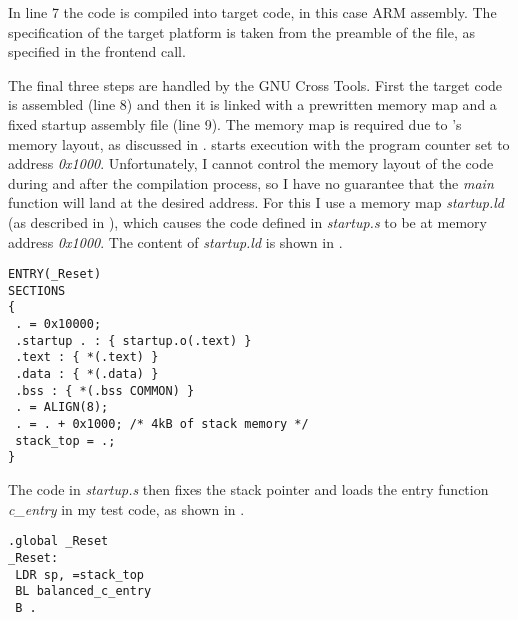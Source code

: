 In line 7 the \ir{} code is compiled into target code, in this case ARM assembly.
The specification of the target platform is taken from the preamble of the \ir{} file, as specified in the frontend call.

The final three steps are handled by the GNU Cross Tools.
First the target code is assembled (line 8) and then it is linked with a prewritten memory map and a fixed startup assembly file (line 9).
The memory map is required due to \qemu{}'s memory layout, as discussed in .
\qemu{} starts execution with the program counter set to address \emph{0x1000}.
Unfortunately, I cannot control the memory layout of the code during and after the compilation process, so I have no guarantee that the \emph{main} function will land at the desired address.
For this I use a memory map \emph{startup.ld} (as described in \cite{armbare}), which causes the code defined in \emph{startup.s} to be at memory address \emph{0x1000}.
The content of \emph{startup.ld} is shown in .

\begin{lstlisting}[caption=Memory map in \emph{startup.ld}, label=lst:mmap]
ENTRY(_Reset)
SECTIONS
{
 . = 0x10000;
 .startup . : { startup.o(.text) }
 .text : { *(.text) }
 .data : { *(.data) }
 .bss : { *(.bss COMMON) }
 . = ALIGN(8);
 . = . + 0x1000; /* 4kB of stack memory */
 stack_top = .;
}
\end{lstlisting}

The code in \emph{startup.s} then fixes the stack pointer and loads the entry function \emph{c\_entry} in my test code, as shown in .

\begin{lstlisting}[caption=Startup assembly code, label=lst:startup]
.global _Reset
_Reset:
 LDR sp, =stack_top
 BL balanced_c_entry
 B .
\end{lstlisting}
